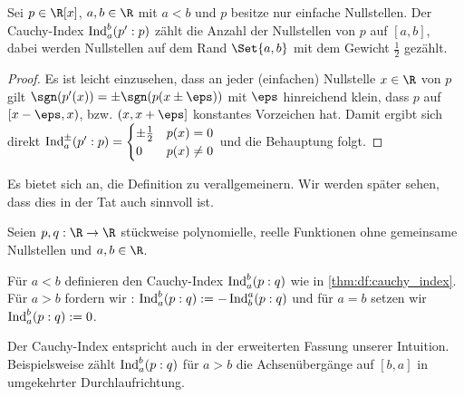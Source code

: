 \documentclass{mythesis}
\begin{document}
\begin{example}
    Sei $p \in \R[x]$, $a,b \in \R$ mit $a < b$ und $p$ besitze nur einfache Nullstellen.
    Der Cauchy-Index $\operatorname{Ind}_a^b(p':p)$ zählt die Anzahl der Nullstellen von $p$ auf $[a,b]$, dabei werden Nullstellen auf dem Rand $\Set{a,b}$ mit dem Gewicht $\frac{1}{2}$ gezählt.
    \begin{proof}
        Es ist leicht einzusehen, dass an jeder (einfachen) Nullstelle $x \in \R$ von $p$ gilt $\sgn(p'(x)) = \pm\sgn(p(x\pm\nobreak\eps))$ mit $\eps$ hinreichend klein, dass $p$ auf $[x-\eps,x)$, bzw. $(x,x+\eps]$ konstantes Vorzeichen hat.
        Damit ergibt sich direkt
        \begin{math}
            \operatorname{Ind}_a^\pm(p':p) = \begin{cases}
                \pm \frac{1}{2} & p(x) = 0 \\
                0 & p(x) \neq 0
            \end{cases}
        \end{math}
        und die Behauptung folgt.
    \end{proof}
\end{example}

Es bietet sich an, die Definition zu verallgemeinern.
Wir werden später sehen, dass dies in der Tat auch sinnvoll ist.

\begin{definition}
    Seien $p, q: \R \to \R$ stückweise polynomielle, reelle Funktionen ohne gemeinsame Nullstellen und $a, b \in \R$.

    Für $a < b$ definieren den Cauchy-Index $\operatorname{Ind}_a^b(p:q)$ wie in \ref{thm:df:cauchy_index}.
    Für $a > b$ fordern wir : $\operatorname{Ind}_a^b(p:q) := -\operatorname{Ind}_b^a(p:q)$ und für $a = b$ setzen wir $\operatorname{Ind}_a^b(p:q) := 0$.
\end{definition}

Der Cauchy-Index entspricht auch in der erweiterten Fassung unserer Intuition.
Beispielsweise zählt $\operatorname{Ind}_a^b(p:\nobreak q)$ für $a > b$ die Achsenübergänge auf $[b, a]$ in umgekehrter Durchlaufrichtung.

%
%
\end{document}
